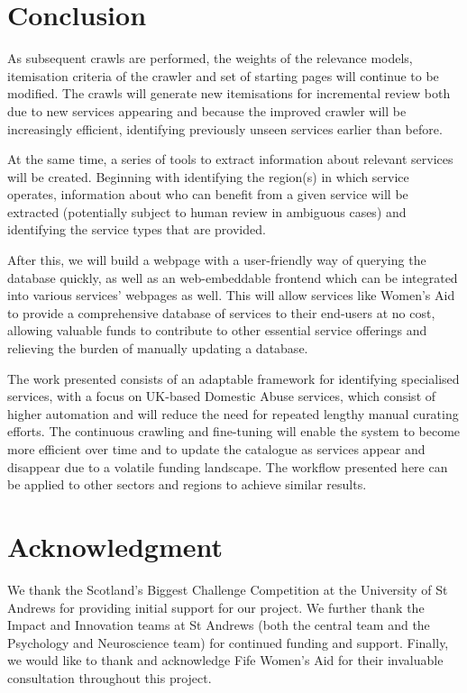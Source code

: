 \documentclass[conference]{IEEEtran}
\begin{document}
\section{Conclusion}
\label{sec:future}

As subsequent crawls are performed, the weights of the relevance models, itemisation criteria of the crawler and set of starting pages will continue to be modified. The crawls will generate new itemisations for incremental review both due to new services appearing and because the improved crawler will be increasingly efficient, identifying previously unseen services earlier than before.

At the same time, a series of tools to extract information about relevant services will be created. Beginning with identifying the region(s) in which service operates, information about who can benefit from a given service will be extracted (potentially subject to human review in ambiguous cases) and identifying the service types that are provided.

After this, we will build a webpage with a user-friendly way of querying the database quickly, as well as an web-embeddable frontend which can be integrated into various services' webpages as well. This will allow services like Women's Aid to provide a comprehensive database of services to their end-users at no cost, allowing valuable funds to contribute to other essential service offerings and relieving the burden of manually updating a database.

The work presented consists of an adaptable framework for identifying specialised services, with a focus on UK-based  Domestic Abuse services, which consist of higher automation and will reduce the need for repeated lengthy manual curating efforts.
The continuous crawling and fine-tuning will enable the system to become more efficient over time and to update the catalogue as services appear and disappear due to a volatile funding landscape. The workflow presented here can be applied to other sectors and regions to achieve similar results.

\section*{Acknowledgment}

We thank the Scotland's Biggest Challenge Competition at the University of St Andrews for providing initial support for our project. We further thank the Impact and Innovation teams at St Andrews (both the central team and the Psychology and Neuroscience team) for continued funding and support. Finally, we would like to thank and acknowledge Fife Women's Aid for their invaluable consultation throughout this project.
\end{document}
